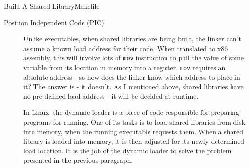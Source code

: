 \begin{frame}{Build A Shared Library}{Makefile}
  \begin{center}
  \end{center}
\end{frame}

\begin{description}
\item[Position Independent Code (PIC)] Unlike executables, when shared libraries are being
  built, the linker can't assume a known load address for their code. When translated to
  x86 assembly, this will involve lots of \texttt{mov} instruction to pull the value of
  some variable from its location in memory into a register. \texttt{mov} requires an
  absolute address - so how does the linker know which address to place in it? The answer
  is - it doesn't. As I mentioned above, shared libraries have no pre-defined load address
  - it will be decided at runtime.

  In Linux, the dynamic loader is a piece of code responsible for preparing programs for
  running. One of its tasks is to load shared libraries from disk into memory, when the
  running executable requests them. When a shared library is loaded into memory, it is
  then adjusted for its newly determined load location. It is the job of the dynamic
  loader to solve the problem presented in the previous paragraph.


\end{description}
